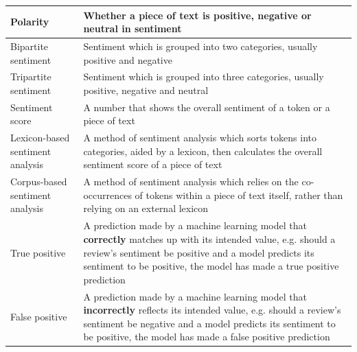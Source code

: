 \documentclass[12pt, bibliography=totocnumbered, paper=a4]{scrartcl}
\def\bf#1{\textbf{#1}}
\begin{document}
\begin{center}
\begin{longtable}{|p{}|p{}|}
		\hline
		Polarity                         & Whether a piece of text is positive, negative or neutral in sentiment                                                                                                                                                                               \\
		\hline
		Bipartite sentiment              & Sentiment which is grouped into two categories, usually positive and negative                                                                                                                                                                       \\
		\hline
		Tripartite sentiment             & Sentiment which is grouped into three categories, usually positive, negative and neutral                                                                                                                                                            \\
		\hline
		Sentiment score                  & A number that shows the overall sentiment of a token or a piece of text                                                                                                                                                                             \\
		\hline
		Lexicon-based sentiment analysis & A method of sentiment analysis which sorts tokens into categories, aided by a lexicon, then calculates the overall sentiment score of a piece of text                                                                                               \\
		\hline
		Corpus-based sentiment analysis  & A method of sentiment analysis which relies on the co-occurrences of tokens within a piece of text itself, rather than relying on an external lexicon                                                                                               \\
		\hline
		True positive                    & A prediction made by a machine learning model that \bf{correctly} matches up with its intended value, e.g. should a review’s sentiment be positive and a model predicts its sentiment to be positive, the model has made a true positive prediction \\
		\hline
		False positive                   & A prediction made by a machine learning model that \bf{incorrectly} reflects its intended value, e.g. should a review’s sentiment be negative and a model predicts its sentiment to be positive, the model has made a false positive prediction     \\
		\hline
	\end{longtable}
\end{center}
\end{document}

